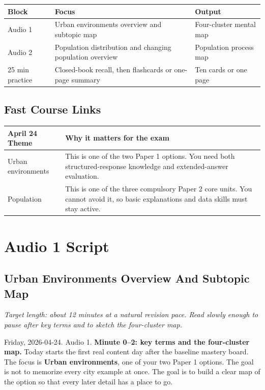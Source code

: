 \documentclass[11pt,a4paper]{article}
\newcommand{\term}[1]{\textcolor{HeadingBlue}{\textbf{#1}}}
\begin{document}
\begin{tabularx}{\textwidth}{L{0.18\textwidth}Y L{0.19\textwidth}}
\toprule
\textbf{Block} & \textbf{Focus} & \textbf{Output} \\
\midrule
Audio 1 & Urban environments overview and subtopic map & Four-cluster mental map \\
Audio 2 & Population distribution and changing population overview & Population process map \\
25 min practice & Closed-book recall, then flashcards or one-page summary & Ten cards or one page \\
\bottomrule
\end{tabularx}

\subsection{Fast Course Links}

\begin{tabularx}{\textwidth}{L{0.22\textwidth}Y}
\toprule
\textbf{April 24 Theme} & \textbf{Why it matters for the exam} \\
\midrule
Urban environments & This is one of the two Paper 1 options. You need both
structured-response knowledge and extended-answer evaluation. \\
Population & This is one of the three compulsory Paper 2 core units. You cannot
avoid it, so basic explanations and data skills must stay active. \\
\bottomrule
\end{tabularx}

\section{Audio 1 Script}
\subsection{Urban Environments Overview And Subtopic Map}

\textit{Target length: about 12 minutes at a natural revision pace. Read slowly
enough to pause after key terms and to sketch the four-cluster map.}

Friday, 2026-04-24. Audio 1.
\textbf{Minute 0--2: key terms and the four-cluster map.}
Today starts the first real content day after the baseline mastery board.
The focus is \term{Urban environments}, one of your two Paper 1 options.
The goal is not to memorize every city example at once. The goal is to build
a clear map of the option so that every later detail has a place to go.
\end{document}
